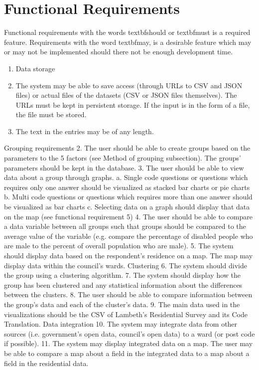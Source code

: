 \section{Functional Requirements}
Functional requirements with the words textbf{should} or textbf{must} is a required feature. Requirements with the word textbf{may}, is a desirable feature which may or may not be implemented should there not be enough development time.


\begin{enumerate}
  \item Data storage
  \item The system may be able to save access (through URLs to CSV and JSON files) or actual files of the datasets (CSV or JSON files themselves). The URLs must be kept in persistent storage. If the input is in the form of a file, the file must be stored.
  \item The text in the entries may be of any length.
\end{enumerate}



Grouping requirements
2.	The user should be able to create groups based on the parameters to the 5 factors (see Method of grouping subsection). The groups’ parameters should be kept in the database.
3.	The user should be able to view data about a group through graphs.
a.	Single code questions or questions which requires only one answer should be visualized as stacked bar charts or pie charts
b.	Multi code questions or questions which requires more than one answer should be visualized as bar charts
c.	Selecting data on a graph should display that data on the map (see functional requirement 5)
4.	The user should be able to compare a data variable between all groups such that groups should be compared to the average value of the variable (e.g. compare the percentage of disabled people who are male to the percent of overall population who are male).
5.	The system should display data based on the respondent’s residence on a map. The map may display data within the council’s wards.
Clustering
6.	The system should divide the group using a clustering algorithm.
7.	The system should display how the group has been clustered and any statistical information about the differences between the clusters.
8.	The user should be able to compare information between the group’s data and each of the cluster’s data.
9.	The main data used in the visualizations should be the CSV of Lambeth’s Residential Survey and its Code Translation.
Data integration
10.	The system may integrate data from other sources (i.e. government’s open data, council’s open data) to a ward (or post code if possible).
11.	The system may display integrated data on a map. The user may be able to compare a map about a field in the integrated data to a map about a field in the residential data.


